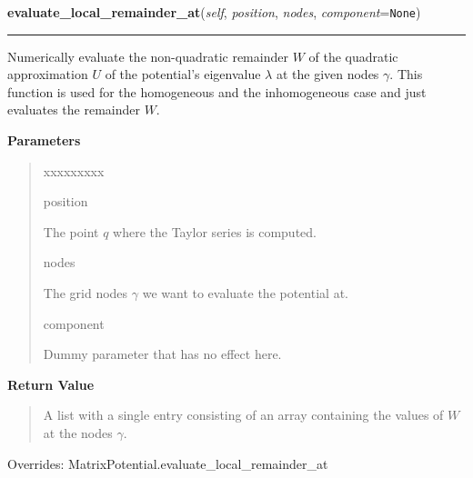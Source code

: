 \hspace{.8\funcindent}\begin{boxedminipage}{\funcwidth}

    \raggedright \textbf{evaluate\_local\_remainder\_at}(\textit{self}, \textit{position}, \textit{nodes}, \textit{component}={\tt None})

    \vspace{-1.5ex}

    \rule{\textwidth}{0.5\fboxrule}
\setlength{\parskip}{2ex}
    Numerically evaluate the non-quadratic remainder $W$ of the quadratic
    approximation $U$ of the potential's eigenvalue
    $\lambda$ at the given nodes
    $\gamma$. This function is used for the homogeneous
    and the inhomogeneous case and just evaluates the remainder $W$.

\setlength{\parskip}{1ex}
      \textbf{Parameters}
      \vspace{-1ex}

      \begin{quote}
        \begin{Ventry}{xxxxxxxxx}

          \item[position]

          The point $q$ where the Taylor series is computed.

          \item[nodes]

          The grid nodes $\gamma$ we want to evaluate the
          potential at.

          \item[component]

          Dummy parameter that has no effect here.

        \end{Ventry}

      \end{quote}

      \textbf{Return Value}
    \vspace{-1ex}

      \begin{quote}
      A list with a single entry consisting of an array containing the
      values of $W$ at the nodes $\gamma$.

      \end{quote}

      Overrides: MatrixPotential.evaluate\_local\_remainder\_at

    \end{boxedminipage}

